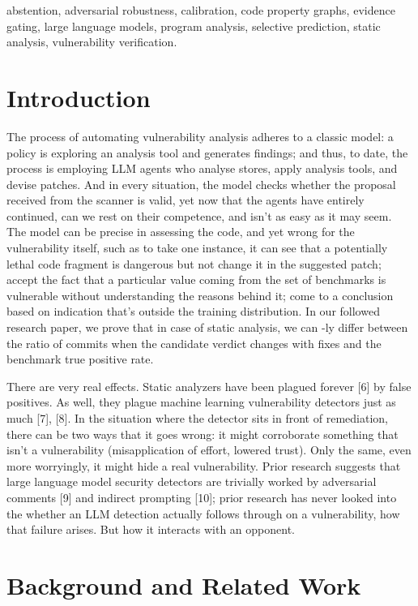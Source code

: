 \documentclass[conference]{IEEEtran}
\begin{document}
\begin{IEEEkeywords}
abstention, adversarial robustness, calibration, code property graphs, evidence gating, large language models, program analysis, selective prediction, static analysis, vulnerability verification.
\end{IEEEkeywords}

\section{Introduction}

The process of automating vulnerability analysis adheres to a classic model: a policy is exploring an analysis tool and generates findings; and thus, to date, the process is employing LLM agents who analyse stores, apply analysis tools, and devise patches. And in every situation, the model checks whether the proposal received from the scanner is valid, yet now that the agents have entirely continued, can we rest on their competence, and isn't as easy as it may seem. The model can be precise in assessing the code, and yet wrong for the vulnerability itself, such as to take one instance, it can see that a potentially lethal code fragment is dangerous but not change it in the suggested patch; accept the fact that a particular value coming from the set of benchmarks is vulnerable without understanding the reasons behind it; come to a conclusion based on indication that's outside the training distribution. In our followed research paper, we prove that in case of static analysis, we can -ly differ between the ratio of commits when the candidate verdict changes with fixes and the benchmark true positive rate.

There are very real effects. Static analyzers have been plagued forever [6] by false positives. As well, they plague machine learning vulnerability detectors just as much [7], [8]. In the situation where the detector sits in front of remediation, there can be two ways that it goes wrong: it might corroborate something that isn’t a vulnerability (misapplication of effort, lowered trust). Only the same, even more worryingly, it might hide a real vulnerability. Prior research suggests that large language model security detectors are trivially worked by adversarial comments [9] and indirect prompting [10]; prior research has never looked into the whether an LLM detection actually follows through on a vulnerability, how that failure arises. But how it interacts with an opponent.

\section{Background and Related Work}
\end{document}
